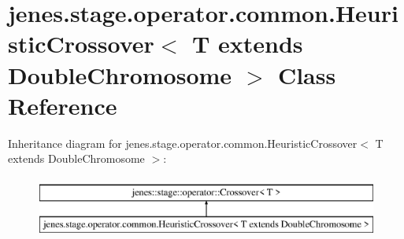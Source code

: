 \hypertarget{classjenes_1_1stage_1_1operator_1_1common_1_1_heuristic_crossover_3_01_t_01extends_01_double_chromosome_01_4}{\section{jenes.\-stage.\-operator.\-common.\-Heuristic\-Crossover$<$ T extends Double\-Chromosome $>$ Class Reference}
\label{classjenes_1_1stage_1_1operator_1_1common_1_1_heuristic_crossover_3_01_t_01extends_01_double_chromosome_01_4}
}
Inheritance diagram for jenes.\-stage.\-operator.\-common.\-Heuristic\-Crossover$<$ T extends Double\-Chromosome $>$\-:\begin{figure}[H]
\begin{center}
\leavevmode
\includegraphics[height=2.000000cm]{classjenes_1_1stage_1_1operator_1_1common_1_1_heuristic_crossover_3_01_t_01extends_01_double_chromosome_01_4}
\end{center}
\end{figure}
